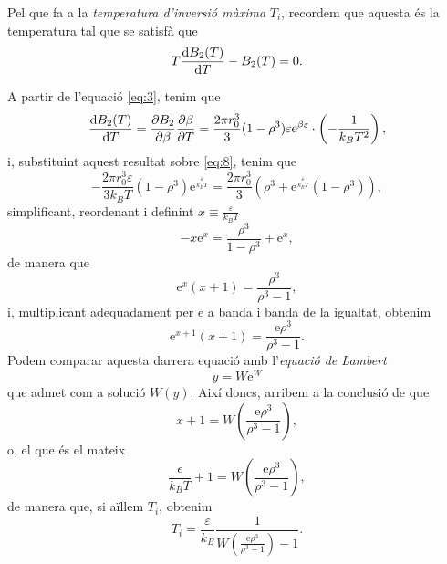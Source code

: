\documentclass[a4paper, 10pt]{article}
\begin{document}
Pel que fa a la \textit{temperatura d'inversió màxima} $T_i$, recordem que aquesta és la temperatura tal que se satisfà que
\begin{equation}
	T\derivative{B_2(T)}{T}-B_2(T)=0. \label{eq:8}
\end{equation}

A partir de l'equació \eqref{eq:3}, tenim que
\begin{equation*}
	\derivative{B_2(T)}{T} = \frac{\partial B_2}{\partial \beta}\frac{\partial \beta}{\partial T} = \frac{2\pi r_0^3}{3}(1-\rho^3)\varepsilon\mathrm{e}^{\beta \varepsilon}\cdot\left(-\frac{1}{k_BT^2}\right),
\end{equation*}
i, substituint aquest resultat sobre \eqref{eq:8}, tenim que
\begin{equation*}
	-\frac{2\pi r_0^3\varepsilon}{3k_BT}(1-\rho^3)\mathrm{e}^{\frac{\varepsilon}{k_BT}} = \frac{2\pi r_0^3}{3}(\rho^3+\mathrm{e}^{\frac{\varepsilon}{k_BT}}(1-\rho^3)),
\end{equation*}
simplificant, reordenant i definint $x\equiv \frac{\varepsilon}{k_BT}$
\begin{equation*}
	-x\mathrm{e}^x=\frac{\rho^3}{1-\rho^3} + \mathrm{e}^x,
\end{equation*}
de manera que
\begin{equation*}
	\mathrm{e}^x(x+1) = \frac{\rho^3}{\rho^3-1},
\end{equation*}
i, multiplicant adequadament per $\mathrm{e}$ a banda i banda de la igualtat, obtenim
\begin{equation}
	\mathrm{e}^{x+1}(x+1) = \frac{\mathrm{e}\rho^3}{\rho^3-1}.
\end{equation}
Podem comparar aquesta darrera equació amb l'\textit{equació de Lambert}
\begin{equation}
	y = W\mathrm{e}^W
\end{equation}
que admet com a solució $W(y)$. Així doncs, arribem a la conclusió de que
\begin{equation*}
	x+1 = W\left(\frac{\mathrm{e}\rho^3}{\rho^3-1}\right),
\end{equation*}
o, el que és el mateix 
\begin{equation*}
	\frac{\epsilon}{k_BT}+1 = W\left(\frac{\mathrm{e}\rho^3}{\rho^3-1}\right),
\end{equation*}
de manera que, si aïllem $T_i$, obtenim
\begin{equation}
	\boxed{T_i=\frac{\varepsilon}{k_B}\frac{1}{W\left(\frac{\mathrm{e}\rho^3}{\rho^3-1}\right)-1}}.
\label{eq:11} 	
\end{equation}
\end{document}
